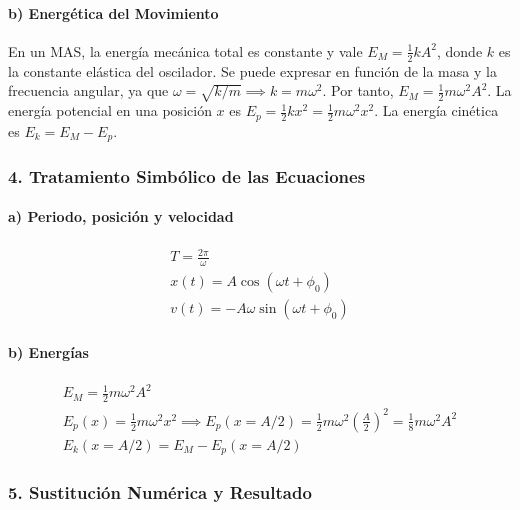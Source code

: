 \paragraph*{b) Energética del Movimiento}
En un MAS, la energía mecánica total es constante y vale $E_M = \frac{1}{2}kA^2$, donde $k$ es la constante elástica del oscilador. Se puede expresar en función de la masa y la frecuencia angular, ya que $\omega = \sqrt{k/m} \implies k=m\omega^2$. Por tanto, $E_M = \frac{1}{2}m\omega^2A^2$.
La energía potencial en una posición $x$ es $E_p = \frac{1}{2}kx^2 = \frac{1}{2}m\omega^2x^2$.
La energía cinética es $E_k = E_M - E_p$.

\subsubsection*{4. Tratamiento Simbólico de las Ecuaciones}
\paragraph*{a) Periodo, posición y velocidad}
\begin{gather}
    T = \frac{2\pi}{\omega} \\
    x(t) = A \cos(\omega t + \phi_0) \\
    v(t) = -A\omega \sin(\omega t + \phi_0)
\end{gather}
\paragraph*{b) Energías}
\begin{gather}
    E_M = \frac{1}{2}m\omega^2A^2 \\
    E_p(x) = \frac{1}{2}m\omega^2x^2 \implies E_p(x=A/2) = \frac{1}{2}m\omega^2\left(\frac{A}{2}\right)^2 = \frac{1}{8}m\omega^2A^2 \\
    E_k(x=A/2) = E_M - E_p(x=A/2)
\end{gather}

\subsubsection*{5. Sustitución Numérica y Resultado}
